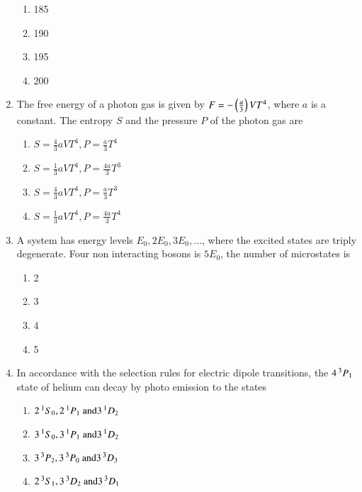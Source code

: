 \documentclass[journal]{IEEEtran}
\begin{document}
\begin{enumerate}[start=35]
\begin{multicols}{4}
\begin{enumerate}
        \item 185
        \item 190
        \item 195
        \item 200
    \end{enumerate}
\end{multicols}
\item The free energy of a photon gas is given by $F=-\left(\frac{a}{3}\right)VT^4$, where $a$ is a constant. The entropy $S$ and the pressure $P$ of the photon gas are
\begin{multicols}{2}
    \begin{enumerate}
        \item $S=\frac{4}{3}aVT^4, P=\frac{a}{3}T^4$
        \item $S=\frac{1}{3}aVT^4, P=\frac{4a}{3}T^3$
        \item $S=\frac{4}{3}aVT^4, P=\frac{a}{3}T^3$
        \item $S=\frac{1}{3}aVT^4, P=\frac{4a}{3}T^4$
    \end{enumerate}
\end{multicols}
\item A system has energy levels $E_0,2E_0,3E_0,\dots$, where the excited states are triply degenerate. Four non interacting bosons is $5E_0$, the number of microstates is
\begin{multicols}{4}
    \begin{enumerate}
        \item 2
        \item 3
        \item 4
        \item 5
    \end{enumerate}
\end{multicols}
\item In accordance with the selection rules for electric dipole transitions, the $4\prescript{3}{}{P}_1$ state of helium can decay by photo emission to the states
\begin{multicols}{2}
    \begin{enumerate}
        \item $2\prescript{1}{}{S}_0,2\prescript{1}{}{P}_1 \text{ and} 3\prescript{1}{}{D}_2$
        \item $3\prescript{1}{}{S}_0,3\prescript{1}{}{P}_1 \text{ and} 3\prescript{1}{}{D}_2$
        \item $3\prescript{3}{}{P}_2,3\prescript{3}{}{P}_0 \text{ and} 3\prescript{3}{}{D}_3$
        \item $2\prescript{3}{}{S}_1,3\prescript{3}{}{D}_2 \text{ and} 3\prescript{3}{}{D}_1$

\end{enumerate}
\end{multicols}
\end{enumerate}
\end{document}
